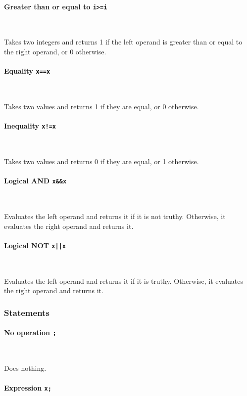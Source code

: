 \paragraph{Greater than or equal to \quad \texttt{i>=i}} \

Takes two integers and returns 1 if the left operand is greater than or equal to the right operand, or 0 otherwise.

\paragraph{Equality \quad \texttt{x==x}} \

Takes two values and returns 1 if they are equal, or 0 otherwise.

\paragraph{Inequality \quad \texttt{x!=x}} \

Takes two values and returns 0 if they are equal, or 1 otherwise.

\paragraph{Logical AND \quad \texttt{x\&\&x}} \

Evaluates the left operand and returns it if it is not truthy. Otherwise, it evaluates the right operand and returns it.

\paragraph{Logical NOT \quad \texttt{x||x}} \

Evaluates the left operand and returns it if it is truthy. Otherwise, it evaluates the right operand and returns it.

\subsubsection{Statements}

\paragraph{No operation \quad \texttt{;}} \

Does nothing.

\paragraph{Expression \quad \texttt{x;}} \

